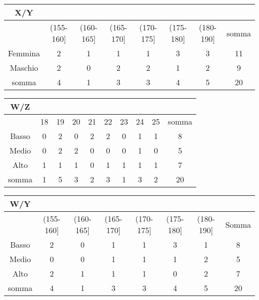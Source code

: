 \noindent
\begin{tabular}{|c|c|c|c|c|c|c|c|}
        \hline
        X/Y&&&&&&&\\ 
        \hline
&       {\scriptsize (155-160]}&        {\scriptsize (160-165]} 
&{\scriptsize (165-170]}&       {\scriptsize (170-175]} &{\scriptsize 
(175-180]}&     {\scriptsize (180-190]}&        {\scriptsize somma}\\
\hline 
Femmina&        2&      1&      1&      1&      3&      3&      11\\
\hline
Maschio&        2&      0&      2&      2&      1&      2&      9\\
\hline
somma&  4&      1&      3&      3&      4&      5&      20\\
        \hline
\end{tabular}

\noindent
\begin{tabular}{|c|c|c|c|c|c|c|c|c|c|}
        \hline
        W/Z&&&&&&&&&\\ 
        \hline
&       18&     19&     20&     21&     22&     23&     24&     25&     
somma\\ 
\hline
Basso&  0       &2&     0&      2       &2      &0      &1&1    &8\\
\hline
Medio & 0&      2&      2       &0&     0&      0       &1      &0&     5\\
\hline
Alto&   1&      1&      1&      0&      1&      1&      1&      1&      7\\
\hline
somma & 1&      5&      3&      2&      3       &1      &3      &2      
&20\\
\hline
\end{tabular}

\noindent
\begin{tabular}{|c|c|c|c|c|c|c|c|}
        \hline
        W/Y&&&&&&&\\ 
        \hline
&{\scriptsize   (155-160]}&     {\scriptsize (160-165]}&        
{\scriptsize (165-170]}&        {\scriptsize (170-175]} &{\scriptsize 
(175-180]}&     {\scriptsize (180-190]}&        {\scriptsize Somma}\\ 
\hline
Basso&  2&      0&      1&      1&      3&      1&      8\\
\hline
Medio & 0&      0&      1&      1&      1&      2&      5\\
\hline
Alto&   2&      1&      1&      1&      0&      2&      7\\
\hline
somma&  4&      1&      3&      3&      4&      5&      20\\
\hline
\end{tabular}

